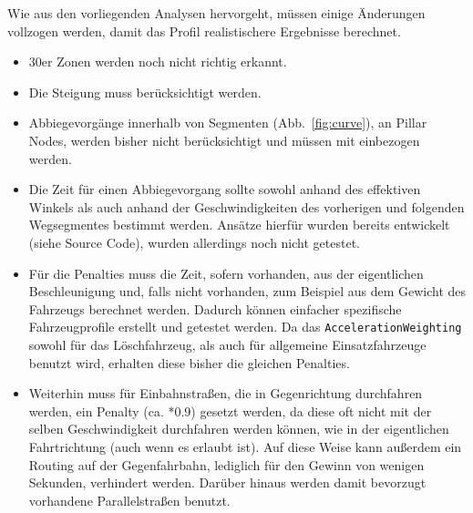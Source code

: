 Wie aus den vorliegenden Analysen hervorgeht, müssen einige Änderungen vollzogen werden, damit das Profil realistischere Ergebnisse berechnet.\par
\begin{itemize}
\item 30er Zonen werden noch nicht richtig erkannt.
\item Die Steigung muss berücksichtigt werden.
\item Abbiegevorgänge innerhalb von Segmenten (Abb.~\ref{fig:curve}), an Pillar Nodes, werden bisher nicht berücksichtigt und müssen mit einbezogen werden.
\item Die Zeit für einen Abbiegevorgang sollte sowohl anhand des effektiven Winkels als auch anhand der Geschwindigkeiten des vorherigen und folgenden Wegsegmentes bestimmt werden.
Ansätze hierfür wurden bereits entwickelt (siehe Source Code), wurden allerdings noch nicht getestet.
\item Für die Penalties muss die Zeit, sofern vorhanden, aus der eigentlichen Beschleunigung und, falls nicht vorhanden, zum Beispiel aus dem Gewicht des Fahrzeugs berechnet werden.
Dadurch können einfacher spezifische Fahrzeugprofile erstellt und getestet werden.
Da das \texttt{AccelerationWeighting} sowohl für das Löschfahrzeug, als auch für allgemeine Einsatzfahrzeuge benutzt wird, erhalten diese bisher die gleichen Penalties.
\item Weiterhin muss für Einbahnstraßen, die in Gegenrichtung durchfahren werden, ein Penalty (ca. *0.9) gesetzt werden, da diese oft nicht mit der selben Geschwindigkeit durchfahren werden können, wie in der eigentlichen Fahrtrichtung (auch wenn es erlaubt ist).
Auf diese Weise kann außerdem ein Routing auf der Gegenfahrbahn, lediglich für den Gewinn von wenigen Sekunden, verhindert werden.
Darüber hinaus werden damit bevorzugt vorhandene Parallelstraßen benutzt.
\end{itemize}